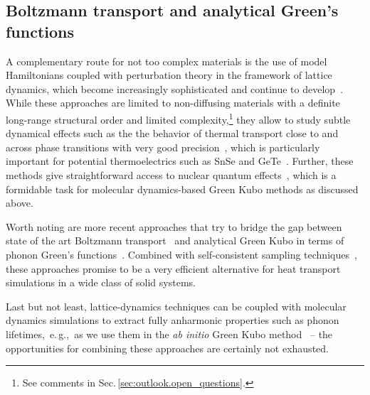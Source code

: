 \subsection{Boltzmann transport and analytical Green's functions}
A complementary route for not too complex materials is the use of model Hamiltonians coupled with perturbation theory in the framework of lattice dynamics, which become increasingly sophisticated and continue to develop~\cite{Esfarjani2008,Hellman2013,Hellman2013b,errea2014,Tadano2018,Zhou2019}. While these approaches are limited to non-diffusing materials with a definite long-range structural order and limited complexity,\footnote{See comments in Sec.\,\ref{sec:outlook.open_questions}.} they allow to study subtle dynamical effects such as the the behavior of thermal transport close to and across phase transitions with very good precision~\cite{dangic2021}, which is particularly important for potential thermoelectrics such as SnSe and GeTe~\cite{zhao2014,Dewandre2016,dangic2021}. Further, these methods give straightforward access to nuclear quantum effects~\cite{shulumba2017}, which is a formidable task for molecular dynamics-based Green Kubo methods as discussed above.

Worth noting are more recent approaches that try to bridge the gap between state of the art Boltzmann transport~\cite{Simoncelli2019} and analytical Green Kubo in terms of phonon Green's functions~\cite{Isaeva2019,dangic2021}. Combined with self-consistent sampling techniques~\cite{brown2013}, these approaches promise to be a very efficient alternative for heat transport simulations in a wide class of solid systems.

Last but not least, lattice-dynamics techniques can be coupled with molecular dynamics simulations to extract fully anharmonic properties such as phonon lifetimes,~e.\,g.,~as we use them in the \emph{ab initio} Green Kubo method~\cite{Ladd1986,Turney2009,Zhang2014,Carbogno2016,Glensk2019} -- the opportunities for combining these approaches are certainly not exhausted.




